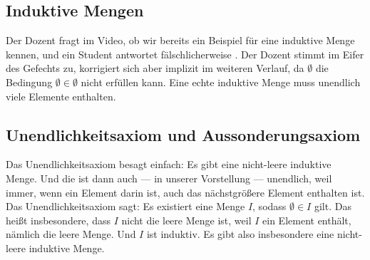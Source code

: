 \subsection{Induktive Mengen}
\begin{math-stroke}


\begin{ai-note}
Der Dozent fragt im Video, ob wir bereits ein Beispiel für eine induktive Menge kennen, und ein Student antwortet fälschlicherweise . Der Dozent stimmt im Eifer des Gefechts zu, korrigiert sich aber implizit im weiteren Verlauf, da $\emptyset$ die Bedingung $\emptyset \in \emptyset$ nicht erfüllen kann. Eine echte induktive Menge muss unendlich viele Elemente enthalten.
\end{ai-note}
\end{math-stroke}

\subsection{Unendlichkeitsaxiom und Aussonderungsaxiom}
\begin{spoken-clean}[00:22:54 - 00:25:03]
Das Unendlichkeitsaxiom besagt einfach: Es gibt eine nicht-leere induktive Menge. Und die ist dann auch --- in unserer Vorstellung --- unendlich, weil immer, wenn ein Element darin ist, auch das nächstgrößere Element enthalten ist. Das Unendlichkeitsaxiom sagt: Es existiert eine Menge $I$, sodass $\emptyset \in I$ gilt. Das heißt insbesondere, dass $I$ nicht die leere Menge ist, weil $I$ ein Element enthält, nämlich die leere Menge. Und $I$ ist induktiv. Es gibt also insbesondere eine nicht-leere induktive Menge.
\end{spoken-clean}

